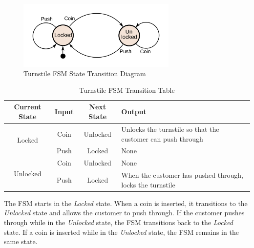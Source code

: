 \begin{figure}[H]
    \centering
    \includegraphics[width=0.7\textwidth]{img/fsm_turnstile.png}
    \caption{Turnstile FSM State Transition Diagram}
    \label{fig:fsm_turnstile_diagram}
\end{figure}

\begin{table}[H]
    \centering
    \begin{tabular}{|c|c|c|l|}
        \hline
        \textbf{Current State}    & \textbf{Input} & \textbf{Next State} & \textbf{Output}                                             \\
        \hline
        \multirow{2}{*}{Locked}   & Coin           & Unlocked            & Unlocks the turnstile so that the customer can push through \\
                                  & Push           & Locked              & None                                                        \\
        \hline
        \multirow{2}{*}{Unlocked} & Coin           & Unlocked            & None                                                        \\
                                  & Push           & Locked              & When the customer has pushed through, locks the turnstile   \\
        \hline
    \end{tabular}
    \caption{Turnstile FSM Transition Table}
    \label{tab:fsm_turnstile_table}
\end{table}

The FSM starts in the \textit{Locked} state.
When a coin is inserted, it transitions to the \textit{Unlocked} state and allows the customer to push through.
If the customer pushes through while in the \textit{Unlocked} state, the FSM transitions back to the \textit{Locked} state.
If a coin is inserted while in the \textit{Unlocked} state, the FSM remains in the same state.

